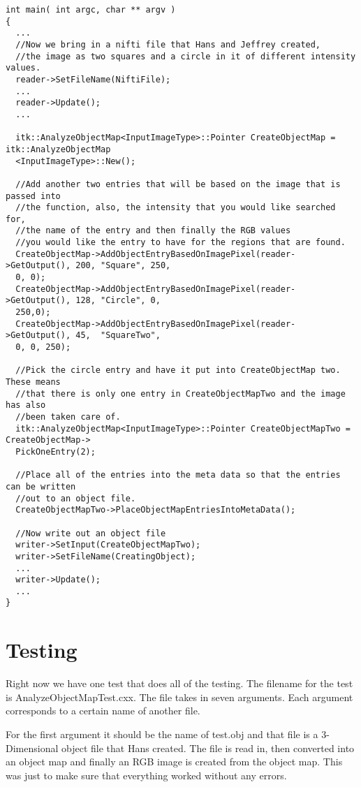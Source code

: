 \documentclass{InsightArticle}
\begin{document}
\begin{itemize}
\begin{verbatim}
int main( int argc, char ** argv )
{
  ...
  //Now we bring in a nifti file that Hans and Jeffrey created, 
  //the image as two squares and a circle in it of different intensity values.
  reader->SetFileName(NiftiFile);
  ...
  reader->Update();
  ...
  
  itk::AnalyzeObjectMap<InputImageType>::Pointer CreateObjectMap = itk::AnalyzeObjectMap
  <InputImageType>::New();
  
  //Add another two entries that will be based on the image that is passed into 
  //the function, also, the intensity that you would like searched for, 
  //the name of the entry and then finally the RGB values
  //you would like the entry to have for the regions that are found.
  CreateObjectMap->AddObjectEntryBasedOnImagePixel(reader->GetOutput(), 200, "Square", 250,
  0, 0);
  CreateObjectMap->AddObjectEntryBasedOnImagePixel(reader->GetOutput(), 128, "Circle", 0,
  250,0);
  CreateObjectMap->AddObjectEntryBasedOnImagePixel(reader->GetOutput(), 45,  "SquareTwo", 
  0, 0, 250);
  
  //Pick the circle entry and have it put into CreateObjectMap two.  These means
  //that there is only one entry in CreateObjectMapTwo and the image has also
  //been taken care of.
  itk::AnalyzeObjectMap<InputImageType>::Pointer CreateObjectMapTwo = CreateObjectMap->
  PickOneEntry(2);
  
  //Place all of the entries into the meta data so that the entries can be written
  //out to an object file.
  CreateObjectMapTwo->PlaceObjectMapEntriesIntoMetaData();
  
  //Now write out an object file
  writer->SetInput(CreateObjectMapTwo);
  writer->SetFileName(CreatingObject);
  ...
  writer->Update();
  ...
}
\end{verbatim} \normalsize

\end{itemize}

\section{Testing}

Right now we have one test that does all of the testing.  The filename for the test is AnalyzeObjectMapTest.cxx.  The file takes in seven arguments.
Each argument corresponds to a certain name of another file.  

For the first argument it should be the name of test.obj and that file is a 3-Dimensional object file that Hans created.  The file is read in, then converted into an object map and finally an RGB image is created from the object map.  This was just to make sure that everything worked without any errors.  
\end{document}
